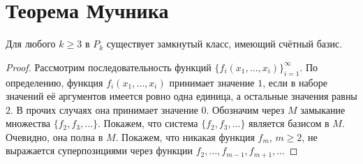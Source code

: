 \section{Теорема Мучника}

\begin{theorem}[Мучник]
    Для любого $k \geqslant 3$ в $P_k$ существует замкнутый класс, имеющий счётный базис.
\end{theorem}

\begin{proof}
    Рассмотрим последовательность функций $\{f_i(x_1, \ldots, x_i)\}_{i = 1}^\infty$. По определению, функция $f_i(x_1, \ldots, x_i)$ принимает значение $1$, если в наборе значений её аргументов имеется ровно одна единица, а остальные значения равны $2$. В прочих случаях она принимает значение $0$. Обозначим через $M$ замыкание множества $\{f_2, f_3, \ldots\}$. Покажем, что система $\{f_2, f_3, \ldots\}$ является базисом в $M$. Очевидно, она полна в $M$. Покажем, что никакая функция $f_m$, $m \geqslant 2$, не выражается суперпозициями через функции $f_2, \ldots, f_{m - 1}, f_{m + 1}, \ldots$


\end{proof}
